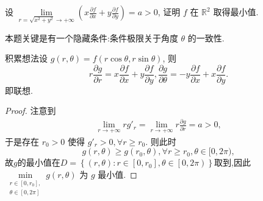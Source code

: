 \documentclass[../../main.tex]{subfiles}
\begin{document}
\begin{example}
设 \( \lim\limits_{r = \sqrt{x^2 + y^2} \to +\infty} \left( x \frac{\partial f}{\partial x} + y \frac{\partial f}{\partial y} \right) = a > 0 \), 证明 \( f \) 在 \( \mathbb{R}^2 \) 取得最小值.
\end{example}
\begin{remark}
本题关键是有一个隐藏条件:条件极限关于角度 \( \theta \) 的一致性.
\end{remark}
\begin{note}
积累想法设 \( g(r, \theta) = f(r \cos \theta, r \sin \theta) \), 则
\[
r \frac{\partial g}{\partial r} = x \frac{\partial f}{\partial x} + y \frac{\partial f}{\partial y}, \frac{\partial g}{\partial \theta} = -y \frac{\partial f}{\partial x} + x \frac{\partial f}{\partial y}.
\]
即联想.
\end{note}
\begin{proof}
注意到
\begin{align*}
\lim\limits_{r \to +\infty} r g'_r = \lim\limits_{r \to +\infty} r \frac{\partial g}{\partial r}= a > 0,
\end{align*}
于是存在 \( r_0 > 0 \) 使得 \( g'_r > 0, \forall r \geqslant r_0 \). 则此时
\[
g(r, \theta) \geqslant g(r_0, \theta), \forall r \geqslant r_0, \theta \in [0, 2\pi),
\]
故$g$的最小值在$D=\left\{ \left( r,\theta \right) :r\in \left[ 0,r_0 \right] ,\theta \in \left[ 0,2\pi \right) \right\}$取到,因此\( \min\limits_{\substack{r \in [0, r_0], \\ \theta \in [0, 2\pi]}} g(r, \theta) \) 为 \( g \) 最小值.
\end{proof}
\end{document}

